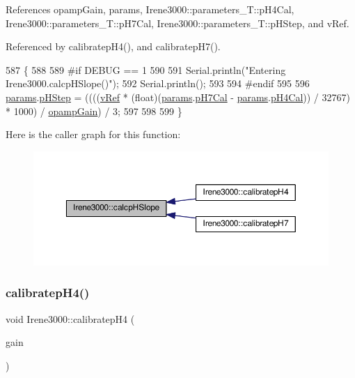 References opamp\+Gain, params, Irene3000\+::parameters\+\_\+\+T\+::p\+H4\+Cal, Irene3000\+::parameters\+\_\+\+T\+::p\+H7\+Cal, Irene3000\+::parameters\+\_\+\+T\+::p\+H\+Step, and v\+Ref.



Referenced by calibratep\+H4(), and calibratep\+H7().


\begin{DoxyCode}
587 \{
588 
589 \textcolor{preprocessor}{#if DEBUG == 1 }
590 
591     Serial.println(\textcolor{stringliteral}{"Entering Irene3000.calcpHSlope()"});
592     Serial.println();
593 
594 \textcolor{preprocessor}{#endif }
595 
596     \hyperlink{classIrene3000_a136585a5ee7f9ac6ab52175fa153f8e3}{params}.\hyperlink{structIrene3000_1_1parameters__T_a61cfcc2539d5f630e9071f3753aba9fe}{pHStep} = ((((\hyperlink{classIrene3000_a018e7ff9bee57e6d2b298667a668ba7e}{vRef} * (float)(\hyperlink{classIrene3000_a136585a5ee7f9ac6ab52175fa153f8e3}{params}.\hyperlink{structIrene3000_1_1parameters__T_a21265466a570d84bff914f26d2f7a03e}{pH7Cal} - 
      \hyperlink{classIrene3000_a136585a5ee7f9ac6ab52175fa153f8e3}{params}.\hyperlink{structIrene3000_1_1parameters__T_a1144de6fb54eb3e1dd2a3d8c2afc97dc}{pH4Cal})) / 32767) * 1000) / \hyperlink{classIrene3000_a4e588985ca74e5076029d5dee81034f2}{opampGain}) / 3;
597 
598  
599 \}
\end{DoxyCode}
Here is the caller graph for this function\+:\nopagebreak
\begin{figure}[H]
\begin{center}
\leavevmode
\includegraphics[width=350pt]{classIrene3000_a81f6a79e546679692053f7ac1af49613_icgraph}
\end{center}
\end{figure}
\mbox{\label{classIrene3000_a9772eeea2305fad6236a82e33e93892e}} 
\subsubsection{\texorpdfstring{calibratep\+H4()}{calibratepH4()}}
{\footnotesize\ttfamily void Irene3000\+::calibratep\+H4 (\begin{DoxyParamCaption}\item[{ads\+Gain\+\_\+t}]{gain }\end{DoxyParamCaption})}

